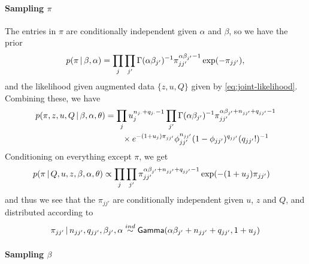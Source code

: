 \paragraph{Sampling $\pi$}

The entries in $\pi$ are conditionally independent given $\alpha$ and
$\beta$, so we have the prior
\begin{equation}
  \label{eq:47}
  p(\pi \, \vert \, \beta, \alpha) = \prod_{j} \prod_{j'}
  \Gamma(\alpha\beta_{j'})^{-1}
  \pi_{jj'}^{\alpha\beta_{j'} - 1} \exp(-\pi_{jj'}),
\end{equation}
and the likelihood given augmented data $\{z, u, Q\}$ given by
\eqref{eq:joint-likelihood}.  Combining these, we have
\begin{align}
  \label{eq:61}
  p(\pi, z, u, Q \, \vert \, \beta, \alpha, \theta) &=
  \prod_{j} u_j^{n_{j\cdot} + q_{j\cdot}
  - 1}\prod_{j'} 
  \Gamma(\alpha\beta_{j'})^{-1} \pi_{jj'}^{\alpha\beta_{j'} + n_{jj'}
    + q_{jj'} - 1} \\&\qquad \times e^{-(1 + u_j)
    \pi_{jj'}} \phi_{jj'}^{n_{jj'}} (1-\phi_{jj'})^{q_{jj'}} (q_{jj'}!)^{-1}
\end{align}
Conditioning on everything except $\pi$, we get
\begin{align}
  \label{eq:24}
  p(\pi \, \vert \, Q, u, z, \beta, \alpha, \theta) &\propto \prod_j
  \prod_{j'} \pi_{jj'}^{\alpha\beta_{j'} + n_{jj'} + q_{jj'} - 1}
  \exp(-(1 + u_j)\pi_{jj'})
\end{align}
and thus we see that the $\pi_{jj'}$ are conditionally independent
given $u$, $z$ and $Q$, and distributed according to
\begin{align}
  \label{eq:25}
  \pi_{jj'} \, \vert \, n_{jj'}, q_{jj'}, \beta_{j'}, \alpha \stackrel{ind}{\sim}
  \mathsf{Gamma}(\alpha\beta_{j'} + n_{jj'} + q_{jj'},1 + u_j)
\end{align}


\paragraph{Sampling $\beta$}
\label{sec:sampling-bbeta}

